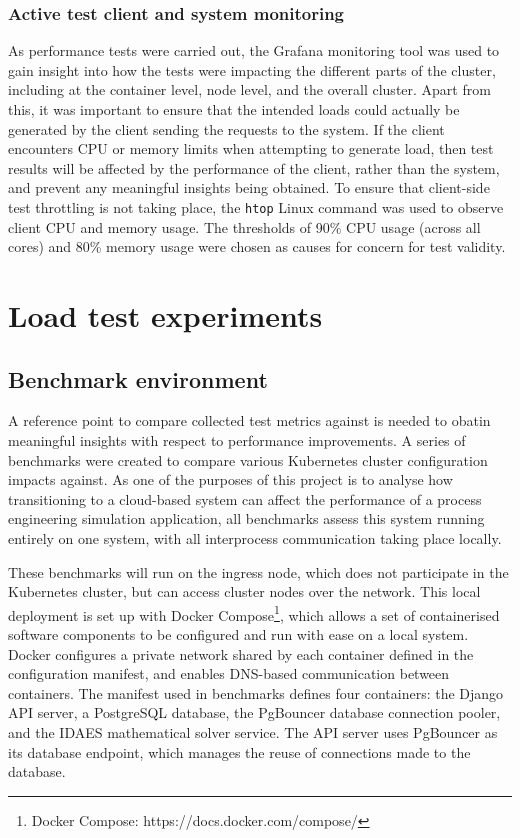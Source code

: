 \subsubsection{Active test client and system monitoring}

As performance tests were carried out, the Grafana monitoring tool was used to gain insight into how the tests were impacting the different parts of the cluster, including at the container level, node level, and the overall cluster. Apart from this, it was important to ensure that the intended loads could actually be generated by the client sending the requests to the system. If the client encounters CPU or memory limits when attempting to generate load, then test results will be affected by the performance of the client, rather than the system, and prevent any meaningful insights being obtained. To ensure that client-side test throttling is not taking place, the \verb|htop| Linux command was used to observe client CPU and memory usage. The thresholds of 90\% CPU usage (across all cores) and 80\% memory usage were chosen as causes for concern for test validity.

\section{Load test experiments}
\subsection{Benchmark environment}

A reference point to compare collected test metrics against is needed to obatin meaningful insights with respect to performance improvements. A series of benchmarks were created to compare various Kubernetes cluster configuration impacts against. As one of the purposes of this project is to analyse how transitioning to a cloud-based system can affect the performance of a process engineering simulation application, all benchmarks assess this system running entirely on one system, with all interprocess communication taking place locally.

These benchmarks will run on the ingress node, which does not participate in the Kubernetes cluster, but can access cluster nodes over the network. This local deployment is set up with Docker Compose\footnote{Docker Compose: https://docs.docker.com/compose/}, which allows a set of containerised software components to be configured and run with ease on a local system. Docker configures a private network shared by each container defined in the configuration manifest, and enables DNS-based communication between containers. The manifest used in benchmarks defines four containers: the Django API server, a PostgreSQL database, the PgBouncer database connection pooler, and the IDAES mathematical solver service. The API server uses PgBouncer as its database endpoint, which manages the reuse of connections made to the database. 

